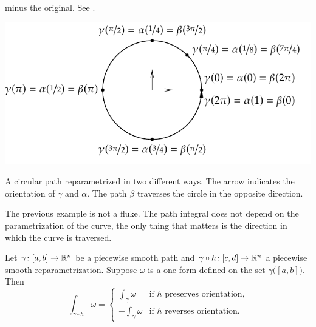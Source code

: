 \begin{example}
minus the original.  See .
\begin{myfigureht}
\includegraphics{figures/circlepathrepar}
\caption{A circular path reparametrized in two different ways. The arrow
indicates the orientation of $\gamma$ and $\alpha$. The path $\beta$ traverses
the circle in the
opposite direction.\label{fig:circlepathrepar}}
\end{myfigureht}
\end{example}

The previous example is not a fluke.
The path integral does not depend on the parametrization of
the curve, the only thing that matters is the direction in which the curve
is traversed.

\begin{prop} \label{mv:prop:pathintrepararam}
Let $\gamma \colon [a,b] \to {\mathbb{R}}^n$ be a piecewise smooth path and
$\gamma \circ h \colon [c,d] \to {\mathbb{R}}^n$ a piecewise smooth reparametrization.
Suppose $\omega$ is a one-form defined on the set $\gamma\bigl([a,b]\bigr)$.  Then
\begin{equation*}
\int_{\gamma \circ h} \omega =
\begin{cases}
\int_{\gamma} \omega  & \text{if } h \text{ preserves orientation,}\\
-\int_{\gamma} \omega & \text{if } h \text{ reverses orientation.}
\end{cases}
\end{equation*}
\end{prop}

